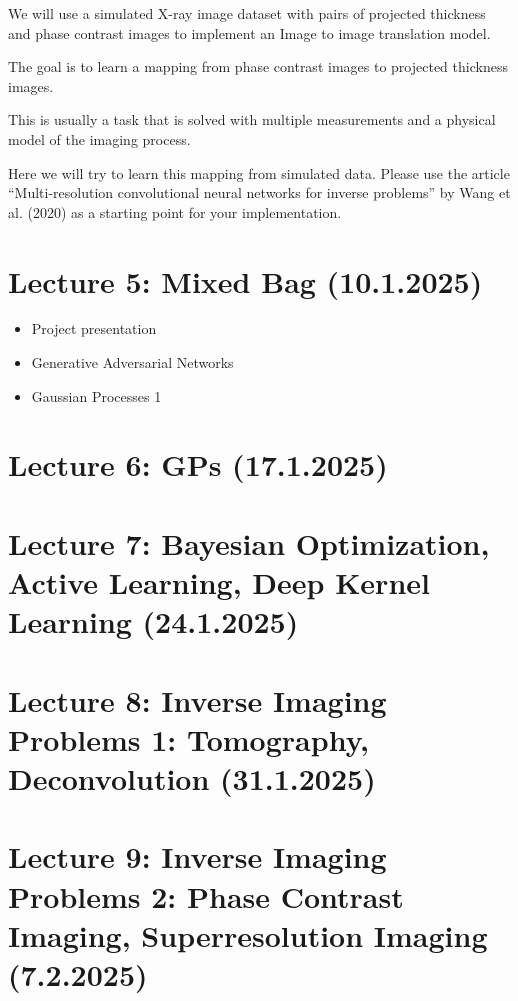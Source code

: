 \documentclass[
]{agujournal2019}
\providecommand{\tightlist}{%
  \setlength{\itemsep}{0pt}\setlength{\parskip}{0pt}}\usepackage{longtable,booktabs,array}
\begin{document}
\begin{enumerate}
  We will use a simulated X-ray image dataset with pairs of projected
  thickness and phase contrast images to implement an Image to image
  translation model.

  The goal is to learn a mapping from phase contrast images to projected
  thickness images.

  This is usually a task that is solved with multiple measurements and a
  physical model of the imaging process.

  Here we will try to learn this mapping from simulated data. Please use
  the article ``Multi-resolution convolutional neural networks for
  inverse problems'' by Wang et al. (2020) as a starting point for your
  implementation.
\end{enumerate}

\section{Lecture 5: Mixed Bag (10.1.2025)}\label{sec-lecture6}

\begin{itemize}
\tightlist
\item
  Project presentation
\item
  Generative Adversarial Networks
\item
  Gaussian Processes 1
\end{itemize}

\section{Lecture 6: GPs (17.1.2025)}\label{sec-lecture7}

\section{Lecture 7: Bayesian Optimization, Active Learning, Deep Kernel
Learning (24.1.2025)}\label{sec-lecture8}

\section{Lecture 8: Inverse Imaging Problems 1: Tomography,
Deconvolution (31.1.2025)}\label{sec-lecture9}

\section{Lecture 9: Inverse Imaging Problems 2: Phase Contrast Imaging,
Superresolution Imaging (7.2.2025)}\label{sec-lecture10}
\end{document}
